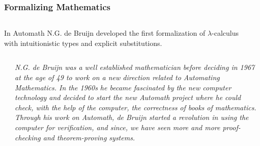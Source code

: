 \documentclass[10pt]{beamer}
\begin{document}
\begin{frame}
\frametitle{Formalizing Mathematics}

\begin{columns}
\begin{column}{0.7\textwidth}  In  {\color{blue} Automath} N.G. de Bruijn developed the first
  formalization of  $\lambda$-calculus with {\color{cyan} intuitionistic types} and
 {\color{cyan} explicit substitutions}. \end{column}
\begin{column}{0.1\textwidth}   \end{column}\end{columns}


\vspace{.5cm}



\begin{columns}
\begin{column}{0.2\textwidth}  \end{column}
\begin{column}{0.7\textwidth} 
\emph{\footnotesize\color{blue}
N.G. de Bruijn was a well established mathematician before deciding in
1967 at the age of 49 to work on a new direction related to Automating
Mathematics. In the 1960s he became fascinated by the new computer
technology and decided to start the new Automath project where he
could check, with the help of the computer, the correctness of books
of mathematics. Through his work on Automath, de Bruijn started a
revolution in using the computer for verification, and since, we have
seen more and more proof-checking and theorem-proving systems. }
\end{column}\end{columns}


\end{frame}
\end{document}
